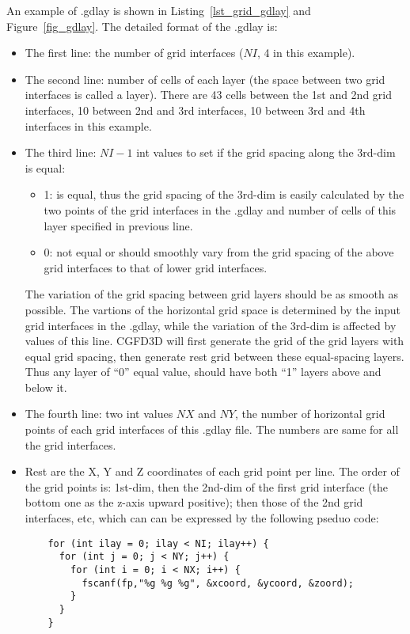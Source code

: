 \begin{itemize}
An example of .gdlay is shown in Listing~\ref{lst_grid_gdlay} and Figure~\ref{fig_gdlay}.
The detailed format of the .gdlay is:
\begin{itemize}
  \item The first line: the number of grid interfaces ($NI$, 4 in this example).
  \item The second line: number of cells of each layer
      (the space between two grid interfaces is called a layer).
    There are 43 cells between the 1st and 2nd grid interfaces,
      10 between 2nd and 3rd interfaces,
      10 between 3rd and 4th interfaces in this example.
 \item The third line: $NI-1$ int values to set if the grid spacing along the 3rd-dim is equal:
   \begin{itemize}
     \item 1: is equal, thus the grid spacing of the 3rd-dim is easily calculated by the two points
         of the grid interfaces in the .gdlay and number of cells of this layer specified in previous line.
     \item 0: not equal or should smoothly vary from 
          the grid spacing of the above grid interfaces to that of lower grid interfaces.
   \end{itemize}
   The variation of the grid spacing between grid layers should be as smooth as possible.
   The vartions of the horizontal grid space is determined by the input grid interfaces in the .gdlay,
    while the variation of the 3rd-dim is affected by values of this line.
   CGFD3D will first generate the grid of the grid layers with equal grid spacing, 
   then generate rest grid between these equal-spacing layers.
   Thus any layer of ``0'' equal value, should have both ``1''  layers above and below it.
  \item The fourth line: two int values $NX$ and $NY$,
        the number of horizontal grid points of each grid interfaces 
         of this .gdlay file. The numbers are same for all the grid interfaces.
  \item 
    Rest are the X, Y and Z coordinates of each grid point per line.
    The order of the grid points is:
      1st-dim, then the 2nd-dim of the first grid interface (the bottom one as the z-axis upward positive);
      then those of the 2nd grid interfaces, etc,
    which can can be expressed by the following pseduo code:
\begin{verbatim}
    for (int ilay = 0; ilay < NI; ilay++) {
      for (int j = 0; j < NY; j++) {
        for (int i = 0; i < NX; i++) {
          fscanf(fp,"%g %g %g", &xcoord, &ycoord, &zoord);
        }
      }
    }
\end{verbatim}


\end{itemize}
\end{itemize}
